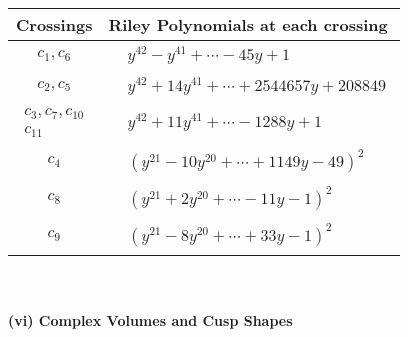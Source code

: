 \documentclass[1p]{elsarticle_modified}
\theoremstyle{definition}
\begin{document}
\begin{tabular}{m{50pt}|m{274pt}}
Crossings & \hspace{64pt}Riley Polynomials at each crossing \\
\hline $$\begin{aligned}c_{1},c_{6}\end{aligned}$$&$\begin{aligned}
&y^{42}- y^{41}+\cdots-45 y+1
\end{aligned}$\\
\hline $$\begin{aligned}c_{2},c_{5}\end{aligned}$$&$\begin{aligned}
&y^{42}+14 y^{41}+\cdots+2544657 y+208849
\end{aligned}$\\
\hline $$\begin{aligned}c_{3},c_{7},c_{10}\\c_{11}\end{aligned}$$&$\begin{aligned}
&y^{42}+11 y^{41}+\cdots-1288 y+1
\end{aligned}$\\
\hline $$\begin{aligned}c_{4}\end{aligned}$$&$\begin{aligned}
&(y^{21}-10 y^{20}+\cdots+1149 y-49)^{2}
\end{aligned}$\\
\hline $$\begin{aligned}c_{8}\end{aligned}$$&$\begin{aligned}
&(y^{21}+2 y^{20}+\cdots-11 y-1)^{2}
\end{aligned}$\\
\hline $$\begin{aligned}c_{9}\end{aligned}$$&$\begin{aligned}
&(y^{21}-8 y^{20}+\cdots+33 y-1)^{2}
\end{aligned}$\\
\hline
\end{tabular}\\~\\
\newpage\flushleft \textbf{(vi) Complex Volumes and Cusp Shapes}
\end{document}
